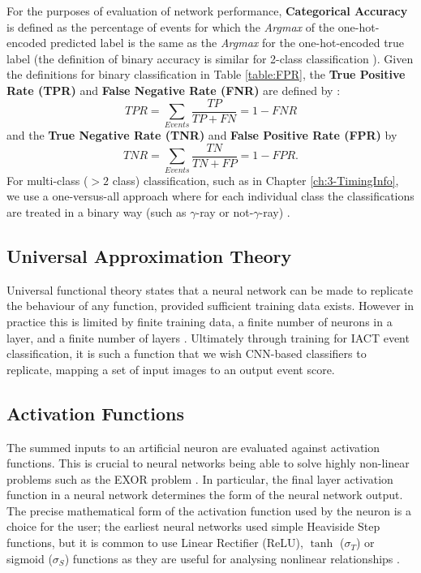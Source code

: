 For the purposes of evaluation of network performance, \textbf{Categorical Accuracy} \cite{Keras} is defined as the percentage of events for which the \textit{Argmax} of the one-hot-encoded predicted label is the same as the \textit{Argmax} for the one-hot-encoded true label (the definition of binary accuracy is similar for 2-class classification \cite{Keras}). Given the definitions for binary classification in Table \ref{table:FPR}, the \textbf{True Positive Rate (TPR)} and \textbf{False Negative Rate (FNR)} are defined by \cite{fawcett}:
\begin{equation}
    TPR=\sum_{Events}\frac{TP}{TP+FN}=1-FNR
\end{equation}
and the \textbf{True Negative Rate (TNR)} and \textbf{False Positive Rate (FPR)} by
\begin{equation}
    TNR=\sum_{Events}\frac{TN}{TN+FP}=1-FPR.
\end{equation} For multi-class ($>2$ class) classification, such as in Chapter \ref{ch:3-TimingInfo}, we use a one-versus-all approach where for each individual class the classifications are treated in a binary way (such as $\gamma$-ray or not-$\gamma$-ray) \cite{fawcett}\cite{scikit}. 

\subsection{Universal Approximation Theory}
Universal functional theory states that a neural network can be made to replicate the behaviour of any function, provided sufficient training data exists. However in practice this is limited by finite training data, a finite number of neurons in a layer, and a finite number of layers \cite{universal}. Ultimately through training for IACT event classification, it is such a function that we wish CNN-based classifiers to replicate, mapping a set of input images to an output event score. 

\subsection{Activation Functions}

The summed inputs to an artificial neuron are evaluated against activation functions. This is crucial to neural networks being able to solve highly non-linear problems such as the EXOR problem \cite{universal}. In particular, the final layer activation function in a neural network determines the form of the neural network output. The precise mathematical form of the activation function used by the neuron is a choice for the user; the earliest neural networks used simple Heaviside Step functions, but 
it is common to use Linear Rectifier (ReLU), $\tanh$ ($\sigma_T$) or sigmoid ($\sigma_S$) functions as they are useful for analysing nonlinear relationships \cite{C++CNN}\cite{Keras}. 

